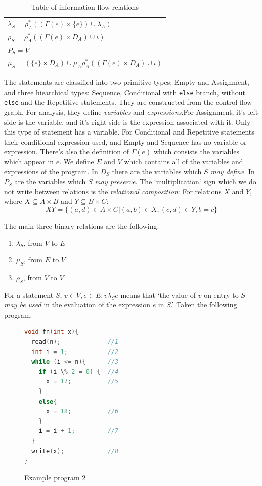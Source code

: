\documentclass[oneside,12pt,a4paper]{book}
\begin{document}
\begin{table}[t]
\begin{tabular}{l}
$\lambda_S = \rho^*_A((\Gamma(e) \times \{e\}) \cup \lambda_A)$                   \\
$\rho_S = \rho^*_A((\Gamma(e) \times D_A) \cup \iota)$                            \\
$P_S = V$                                                                                   \\
$\mu_S = (\{e\} \times D_A) \cup \mu_A\rho^*_A((\Gamma(e) \times D_A) \cup \iota)$\\
  \end{tabular}
  \caption{Table of information flow relations}
  \label{tab:informationFlowTable}
\end{table}
\FloatBarrier
The statements are classified into two primitive types: Empty and Assignment, and three hiearchical types: Sequence, Conditional with \texttt{else} branch, without \texttt{else} and the Repetitive statements. They are constructed from the control-flow graph. For analysis, they define \textit{variables} and \textit{expressions}.For Assignment, it's left side is the variable, and it's right side is the expression associated with it. Only this type of statement has a variable. For Conditional and Repetitive statements their conditional expression used, and Empty and Sequence has no variable or expression. There's also the definition of $\Gamma(e)$ which consists the variables which appear in $e$. We define $E$ and $V$ which contains all of the variables and expressions of the program. In $D_S$ there are the variables which $S$ \textit{may define}. In $P_S$ are the variables which $S$ \textit{may preserve}. The `multiplication` sign which we do not write between relations is the \textit{relational composition}:
For relations $X$ and $Y$, where $X \subseteq A \times B$ and $Y \subseteq B \times C$:
\begin{equation}
XY = \{(a,d) \in A \times C | (a,b) \in X, (c,d) \in Y, b = c\}
\end{equation}

The main three binary relations are the following:
\begin{enumerate}
\item $\lambda_S$, from $V$ to $E$
\item $\mu_S$, from $E$ to $V$
\item $\rho_S$, from $V$ to $V$
\end{enumerate}

For a statement $S$, $v \in V, e \in E: v \lambda_S e$ means that `the value of $v$ on entry to $S$ \textit{may be used} in the evaluation of the expression $e$ in $S$.' Taken the following program:
\begin{figure}[h]
\begin{lstlisting}[language=C++]
void fn(int x){
  read(n);             //1
  int i = 1;           //2
  while (i <= n){      //3
    if (i \% 2 = 0) {  //4
      x = 17;          //5
    }
    else{              
      x = 18;          //6
    }
    i = i + 1;         //7
  }
  write(x);            //8
}
\end{lstlisting}
\caption{Example program 2}
\label{fig:example_prog_2}
\end{figure}
\end{document}
